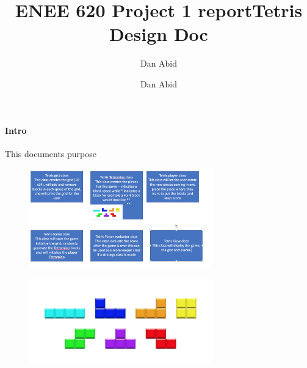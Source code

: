 \documentclass{article}
\title{ENEE 620 Project 1 report}
\author{Dan Abid }
\title{Tetris Design Doc}
\author{Dan Abid }
\begin{document}
\maketitle

\paragraph{Intro}
This documents purpose
\begin{figure}[H]
\includegraphics[width=8cm]{TetrisUML}
\end{figure}
\begin{figure}[H]
\includegraphics[width=8cm]{TetrisBlocks}
\end{figure}
%

\end{document}
